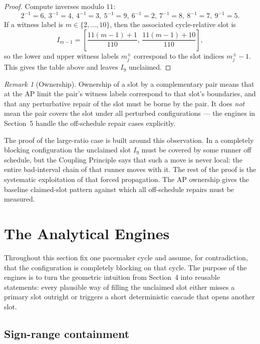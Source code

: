 \documentclass[12pt,a4paper]{amsart}
\theoremstyle{definition}
\theoremstyle{remark}
\newtheorem{remark}[theorem]{Remark}
\begin{document}
\begin{proof}
Compute inverses modulo $11$:
\[
  2^{-1}=6,\ 3^{-1}=4,\ 4^{-1}=3,\ 5^{-1}=9,\ 6^{-1}=2,\ 7^{-1}=8,\ 8^{-1}=7,\ 9^{-1}=5.
\]
If a witness label is $m\in\{2,\ldots,10\}$, then the associated cycle-relative slot is
\[
  I_{m-1} = \left[\frac{11(m-1)+1}{110},\,\frac{11(m-1)+10}{110}\right],
\]
so the lower and upper witness labels $m_j^\pm$ correspond to the slot indices $m_j^\pm-1$.
This gives the table above and leaves $I_9$ unclaimed.
\end{proof}

\begin{remark}[Ownership]\label{rem:ownership}
Ownership of a slot by a complementary pair means that at the AP limit the pair's witness
labels correspond to that slot's boundaries, and that any perturbative repair of the slot
must be borne by the pair. It does \emph{not} mean the pair covers the slot under all
perturbed configurations --- the engines in Section~5 handle the off-schedule repair cases
explicitly.
\end{remark}

The proof of the large-ratio case is built around this observation. In a completely blocking
configuration the unclaimed slot $I_9$ must be covered by some runner off schedule, but
the Coupling Principle says that such a move is never local: the entire bad-interval chain
of that runner moves with it. The rest of the proof is the systematic exploitation of that
forced propagation. The AP ownership gives the baseline claimed-slot pattern against which
all off-schedule repairs must be measured.

\section{The Analytical Engines}

Throughout this section fix one pacemaker cycle and assume, for contradiction, that the
configuration is completely blocking on that cycle. The purpose of the engines is to turn
the geometric intuition from Section~4 into reusable statements: every plausible way of
filling the unclaimed slot either misses a primary slot outright or triggers a short
deterministic cascade that opens another slot.

\subsection{Sign-range containment}
\end{document}
